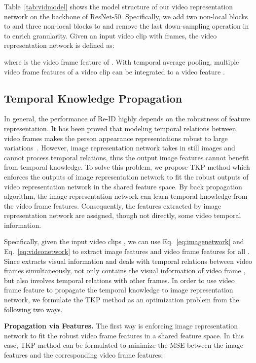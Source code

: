 \documentclass[10pt,twocolumn,letterpaper]{article}
\begin{document}
Table~\ref{tab:vidmodel} shows the model structure of our video representation network on the backbone of ResNet-50.
Specifically, we add two non-local blocks to  and three non-local blocks to  and remove the last down-sampling operation in  to enrich granularity.
Given an input video clip  with  frames, the video representation network  is defined as:

where  is the video frame feature of .
With temporal average pooling, multiple video frame features of a video clip can be integrated to a video feature .

\subsection{Temporal Knowledge Propagation}
\label{sec:tkp}

In general, the performance of Re-ID highly depends on the robustness of feature representation.
It has been proved that modeling temporal relations between video frames makes the person appearance representations robust to large variations~\cite{You2016Top}.
However, image representation network takes in still images and cannot process temporal relations, thus the output image features cannot benefit from temporal knowledge.
To solve this problem, we propose TKP method which enforces the outputs of image representation network to fit the robust outputs of video representation network in the shared feature space.
By back propagation algorithm, the image representation network can learn temporal knowledge from the video frame features.
Consequently, the features extracted by image representation network are assigned, though not directly, some video temporal information.

Specifically, given the input video clips , we can use Eq.~\eqref{eq:imagenetwork} and Eq.~\eqref{eq:videonetwork} to extract image features  and video frame features  for all .
Since  extracts visual information and deals with temporal relations between video frames simultaneously,  not only contains the visual information of video frame , but also involves temporal relations with other frames.
In order to use video frame feature  to propagate the temporal knowledge to image representation network,
we formulate the TKP method as an optimization problem from the following two ways.

\vspace{5pt}
\noindent
{\bf Propagation via Features.} The first way is enforcing image representation network to fit the robust video frame features in a shared feature space. In this case, TKP method can be formulated to minimize the MSE between the image features and the corresponding video frame features:
\end{document}
